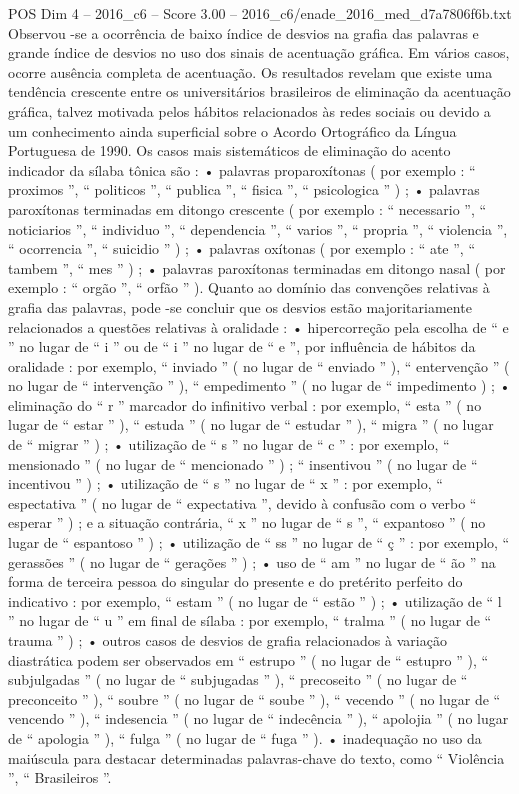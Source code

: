 \begin{textsample}{POS Dim 4 – 2016\_c6 – Score 3.00 – 2016\_c6/enade\_2016\_med\_d7a7806f6b.txt}
Observou -se a ocorrência de baixo índice de desvios na grafia das palavras e grande índice de desvios no uso dos sinais de acentuação gráfica.
Em vários casos, ocorre ausência completa de acentuação.
Os resultados revelam que existe uma tendência crescente entre os universitários brasileiros de eliminação da acentuação gráfica, talvez motivada pelos hábitos relacionados às redes sociais ou devido a um conhecimento ainda superficial sobre o Acordo Ortográfico da Língua Portuguesa de 1990.
Os casos mais sistemáticos de eliminação do acento indicador da sílaba tônica são : • palavras proparoxítonas ( por exemplo : “ proximos ”, “ politicos ”, “ publica ”, “ fisica ”, “ psicologica ” ) ; • palavras paroxítonas terminadas em ditongo crescente ( por exemplo : “ necessario ”, “ noticiarios ”, “ individuo ”, “ dependencia ”, “ varios ”, “ propria ”, “ violencia ”, “ ocorrencia ”, “ suicidio ” ) ; • palavras oxítonas ( por exemplo : “ ate ”, “ tambem ”, “ mes ” ) ; • palavras paroxítonas terminadas em ditongo nasal ( por exemplo : “ orgão ”, “ orfão ” ).
Quanto ao domínio das convenções relativas à grafia das palavras, pode -se concluir que os desvios estão majoritariamente relacionados a questões relativas à oralidade : • hipercorreção pela escolha de “ e ” no lugar de “ i ” ou de “ i ” no lugar de “ e ”, por influência de hábitos da oralidade : por exemplo, “ inviado ” ( no lugar de “ enviado ” ), “ entervenção ” ( no lugar de “ intervenção ” ), “ empedimento ” ( no lugar de “ impedimento ) ; • eliminação do “ r ” marcador do infinitivo verbal : por exemplo, “ esta ” ( no lugar de “ estar ” ), “ estuda ” ( no lugar de “ estudar ” ), “ migra ” ( no lugar de “ migrar ” ) ; • utilização de “ s ” no lugar de “ c ” : por exemplo, “ mensionado ” ( no lugar de “ mencionado ” ) ; “ insentivou ” ( no lugar de “ incentivou ” ) ; • utilização de “ s ” no lugar de “ x ” : por exemplo, “ espectativa ” ( no lugar de “ expectativa ”, devido à confusão com o verbo “ esperar ” ) ; e a situação contrária, “ x ” no lugar de “ s ”, “ expantoso ” ( no lugar de “ espantoso ” ) ; • utilização de “ ss ” no lugar de “ ç ” : por exemplo, “ gerassões ” ( no lugar de “ gerações ” ) ; • uso de “ am ” no lugar de “ ão ” na forma de terceira pessoa do singular do presente e do pretérito perfeito do indicativo : por exemplo, “ estam ” ( no lugar de “ estão ” ) ; • utilização de “ l ” no lugar de “ u ” em final de sílaba : por exemplo, “ tralma ” ( no lugar de “ trauma ” ) ; • outros casos de desvios de grafia relacionados à variação diastrática podem ser observados em “ estrupo ” ( no lugar de “ estupro ” ), “ subjulgadas ” ( no lugar de “ subjugadas ” ), “ precoseito ” ( no lugar de “ preconceito ” ), “ soubre ” ( no lugar de “ soube ” ), “ vecendo ” ( no lugar de “ vencendo ” ), “ indesencia ” ( no lugar de “ indecência ” ), “ apolojia ” ( no lugar de “ apologia ” ), “ fulga ” ( no lugar de “ fuga ” ). • inadequação no uso da maiúscula para destacar determinadas palavras-chave do texto, como “ Violência ”, “ Brasileiros ”.

\end{textsample}
